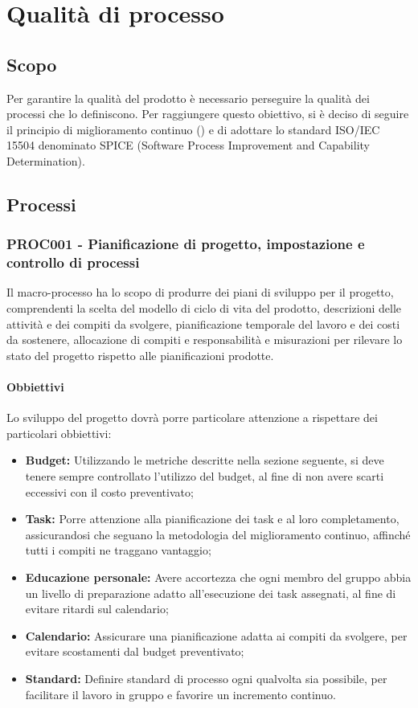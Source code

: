 \documentclass[PianoDiQualifica.tex]{subfiles}
\begin{document}
\chapter{Qualità di processo}

\section{Scopo} 
Per garantire la qualità del prodotto è necessario perseguire la qualità dei processi che lo definiscono.
Per raggiungere questo obiettivo, si è deciso di seguire il principio di miglioramento continuo () e di adottare lo standard ISO/IEC 15504 denominato SPICE (Software Process Improvement and Capability Determination).

\section{Processi}

\subsection{PROC001 - Pianificazione di progetto, impostazione e controllo di processi}
Il macro-processo ha lo scopo di produrre dei piani di sviluppo per il progetto, comprendenti la scelta del modello di ciclo di vita del prodotto, descrizioni delle attività e dei compiti da svolgere, pianificazione temporale del lavoro e dei costi da sostenere, allocazione di compiti e responsabilità e misurazioni per rilevare lo stato del progetto rispetto alle pianificazioni prodotte.

\subsubsection{Obbiettivi}
Lo sviluppo del progetto dovrà porre particolare attenzione a rispettare dei particolari obbiettivi:
\begin{itemize}
	\item \textbf{Budget:} Utilizzando le metriche descritte nella sezione seguente, si deve tenere sempre controllato l'utilizzo del budget, al fine di non avere scarti eccessivi con il costo preventivato;
	\item \textbf{Task:} Porre attenzione alla pianificazione dei task e al loro completamento, assicurandosi che seguano la metodologia del miglioramento continuo, affinché tutti i compiti ne traggano vantaggio;
	\item \textbf{Educazione personale:} Avere accortezza che ogni membro del gruppo abbia un livello di preparazione adatto all'esecuzione dei task assegnati, al fine di evitare ritardi sul calendario;
	\item \textbf{Calendario:} Assicurare una pianificazione adatta ai compiti da svolgere, per evitare scostamenti dal budget preventivato;
	\item \textbf{Standard:} Definire standard di processo ogni qualvolta sia possibile, per facilitare il lavoro in gruppo e favorire un incremento continuo.
\end{itemize}
\end{document}
